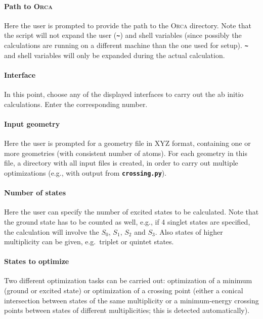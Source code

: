 \documentclass[a4paper,10pt,DIV=15,openany,twoside=false]{scrbook}
\newcommand{\ttt}[1]{\textbf{\texttt{#1}}}
\begin{document}
\paragraph{Path to \textsc{Orca}}

Here the user is prompted to provide the path to the \textsc{Orca} directory. Note that the script will not expand the user (\ttt{\textasciitilde}) and shell variables (since possibly the calculations are running on a different machine than the one used for setup). \ttt{\textasciitilde} and shell variables will only be expanded during the actual calculation.

\paragraph{Interface}

In this point, choose any of the displayed interfaces to carry out the ab initio calculations. Enter the corresponding number. 

\paragraph{Input geometry}

Here the user is prompted for a geometry file in XYZ format, containing one or more geometries (with consistent number of atoms).
For each geometry in this file, a directory with all input files is created, in order to carry out multiple optimizations (e.g., with output from \ttt{crossing.py}).

\paragraph{Number of states}

Here the user can specify the number of excited states to be calculated. Note that the ground state has to be counted as well, e.g., if 4 singlet states are specified, the calculation will involve the $S_0$, $S_1$, $S_2$ and $S_3$. Also states of higher multiplicity can be given, e.g.\ triplet or quintet states. 

\paragraph{States to optimize}

Two different optimization tasks can be carried out: optimization of a minimum (ground or excited state) or optimization of a crossing point (either a conical intersection between states of the same multiplicity or a minimum-energy crossing points between states of different multiplicities; this is detected automatically).
\end{document}
